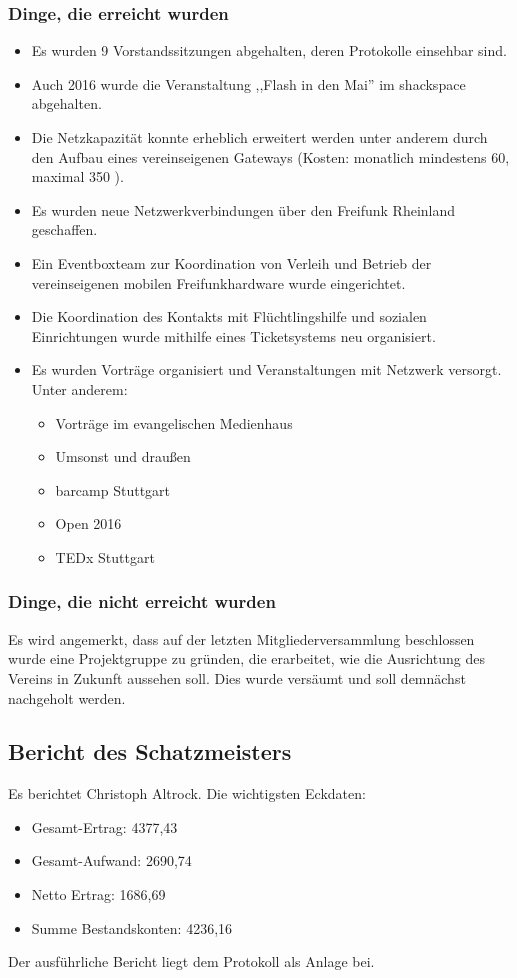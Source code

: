 \documentclass[a4paper]{scrartcl}
\begin{document}
\subsubsection{Dinge, die erreicht wurden}
\begin{itemize}
\item Es wurden 9 Vorstandssitzungen abgehalten, deren Protokolle einsehbar sind.
\item Auch 2016 wurde die Veranstaltung ,,Flash in den Mai'' im shackspace abgehalten.
\item Die Netzkapazität konnte erheblich erweitert werden unter anderem durch den Aufbau eines vereinseigenen Gateways (Kosten: monatlich mindestens 60, maximal 350 \texteuro).
\item Es wurden neue Netzwerkverbindungen über den Freifunk Rheinland geschaffen.
\item Ein Eventboxteam zur Koordination von Verleih und Betrieb der vereinseigenen mobilen Freifunkhardware wurde eingerichtet.
\item Die Koordination des Kontakts mit Flüchtlingshilfe und sozialen Einrichtungen wurde mithilfe eines Ticketsystems neu organisiert.
\item Es wurden Vorträge organisiert und Veranstaltungen mit Netzwerk versorgt. Unter anderem:
\begin{itemize}
\item Vorträge im evangelischen Medienhaus
\item Umsonst und draußen
\item  barcamp Stuttgart
\item  Open 2016
\item  TEDx Stuttgart
\end{itemize}
\end{itemize}
\subsubsection{Dinge, die nicht erreicht wurden}
Es wird angemerkt, dass auf der letzten Mitgliederversammlung beschlossen wurde eine Projektgruppe zu gründen, die erarbeitet, wie die Ausrichtung des Vereins in Zukunft aussehen soll. Dies wurde versäumt und soll demnächst nachgeholt werden.
\subsection{Bericht des Schatzmeisters}
Es berichtet Christoph Altrock. Die wichtigsten Eckdaten:
\begin{itemize}
\item Gesamt-Ertrag: 4377,43 \texteuro
\item Gesamt-Aufwand: 2690,74 \texteuro
\item Netto Ertrag: 1686,69 \texteuro
\item Summe Bestandskonten: 4236,16 \texteuro
\end{itemize}
Der ausführliche Bericht liegt dem Protokoll als Anlage bei.
\end{document}
